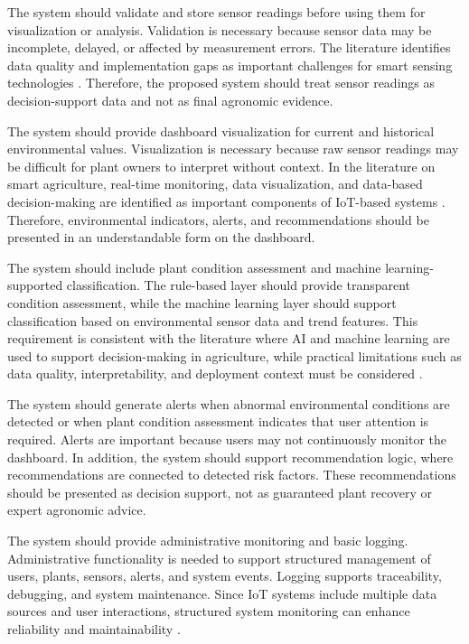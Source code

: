 The system should validate and store sensor readings before using them for visualization or analysis. Validation is necessary because sensor data may be incomplete, delayed, or affected by measurement errors. The literature identifies data quality and implementation gaps as important challenges for smart sensing technologies \cite{miller2025iot}. Therefore, the proposed system should treat sensor readings as decision-support data and not as final agronomic evidence.

The system should provide dashboard visualization for current and historical environmental values. Visualization is necessary because raw sensor readings may be difficult for plant owners to interpret without context. In the literature on smart agriculture, real-time monitoring, data visualization, and data-based decision-making are identified as important components of IoT-based systems \cite{ahmed2024smart,mowla2023iot}. Therefore, environmental indicators, alerts, and recommendations should be presented in an understandable form on the dashboard.

The system should include plant condition assessment and machine learning-supported classification. The rule-based layer should provide transparent condition assessment, while the machine learning layer should support classification based on environmental sensor data and trend features. This requirement is consistent with the literature where AI and machine learning are used to support decision-making in agriculture, while practical limitations such as data quality, interpretability, and deployment context must be considered \cite{miller2025iot,nawaz2025iot}.

The system should generate alerts when abnormal environmental conditions are detected or when plant condition assessment indicates that user attention is required. Alerts are important because users may not continuously monitor the dashboard. In addition, the system should support recommendation logic, where recommendations are connected to detected risk factors. These recommendations should be presented as decision support, not as guaranteed plant recovery or expert agronomic advice.

The system should provide administrative monitoring and basic logging. Administrative functionality is needed to support structured management of users, plants, sensors, alerts, and system events. Logging supports traceability, debugging, and system maintenance. Since IoT systems include multiple data sources and user interactions, structured system monitoring can enhance reliability and maintainability \cite{mowla2023iot,huda2024iot}.

